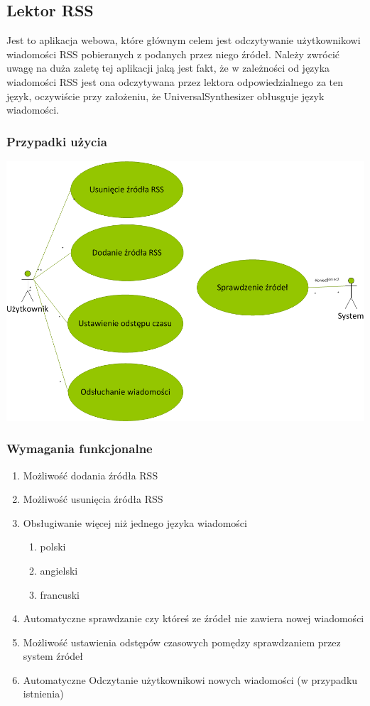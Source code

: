 \subsection{Lektor RSS}
Jest to aplikacja webowa, które głównym celem jest odczytywanie użytkownikowi wiadomości RSS pobieranych z podanych przez niego źródeł. Należy zwrócić uwagę na duża zaletę tej aplikacji jaką jest fakt, że w zależności od języka wiadomości RSS jest ona odczytywana przez lektora odpowiedzialnego za ten język, oczywiście przy założeniu, że UniversalSynthesizer obłusguje język wiadomości.
\subsubsection{Przypadki użycia}
\includegraphics[scale=0.55]{useCaseRSS.png} 
\subsubsection{Wymagania funkcjonalne}
\begin{enumerate}
	\item Możliwość dodania źródła RSS
	\item Możliwość usunięcia źródła RSS
	\item Obsługiwanie więcej niż jednego języka wiadomości
		\begin{enumerate}
			\item polski
			\item angielski
			\item francuski
		\end{enumerate}
	\item Automatyczne sprawdzanie czy któreś ze źródeł nie zawiera nowej wiadomości
	\item Możliwość ustawienia odstępów czasowych pomędzy sprawdzaniem przez system źródeł
	\item Automatyczne Odczytanie użytkownikowi nowych wiadomości (w przypadku istnienia) 
\end{enumerate}  
